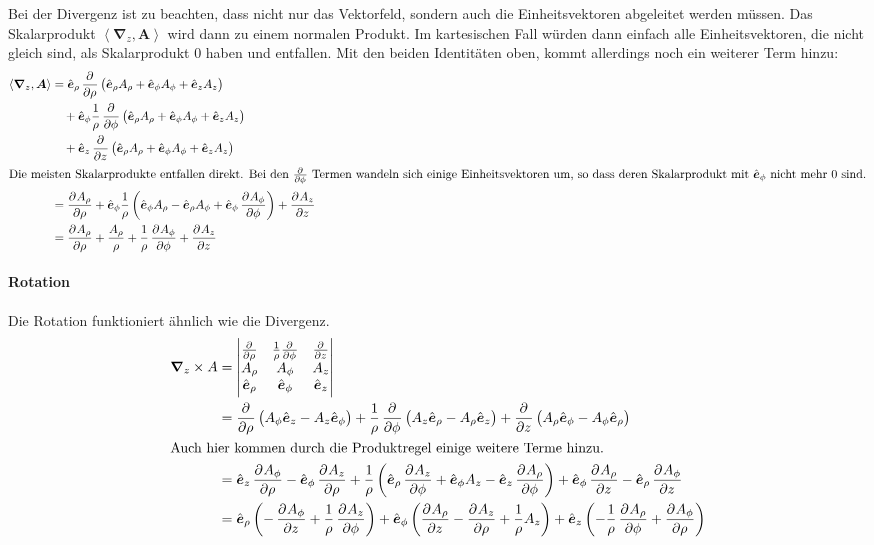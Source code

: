 \documentclass[11pt, ngerman, fleqn]{article}
\newcommand{\ev}{\hat{\vec e}}
\newcommand{\inner}[2]{\left\langle #1, #2 \right\rangle}
\newcommand{\vnabla}{\vec \nabla}
\renewcommand{\vec}[1]{\boldsymbol{#1}}
\begin{document}
Bei der Divergenz ist zu beachten, dass nicht nur das Vektorfeld, sondern auch
die Einheitsvektoren abgeleitet werden müssen. Das Skalarprodukt
$\inner{\vnabla_z}{\vec A}$ wird dann zu einem normalen Produkt. Im
kartesischen Fall würden dann einfach alle Einheitsvektoren, die nicht gleich
sind, als Skalarprodukt 0 haben und entfallen. Mit den beiden Identitäten oben, kommt allerdings noch ein weiterer Term hinzu:
\begin{align*}
	\inner{\vnabla_z}{\vec A}
	&=
	\ev_\rho \dpd{}\rho \del{\ev_\rho A_\rho + \ev_\phi A_\phi + \ev_z A_z} \\
	&\quad+\ev_\phi \frac 1\rho \dpd{}\phi \del{\ev_\rho A_\rho + \ev_\phi A_\phi + \ev_z A_z} \\
	&\quad+\ev_z \dpd{}z \del{\ev_\rho A_\rho + \ev_\phi A_\phi + \ev_z A_z} \\
	\intertext{Die meisten Skalarprodukte entfallen direkt. Bei den $\pd{}\phi$ Termen wandeln sich einige Einheitsvektoren um, so dass deren Skalarprodukt mit $\ev_\phi$ nicht mehr 0 sind.}
	&=
	\dpd{A_\rho}\rho + \ev_\phi \frac 1\rho \del{
		\ev_\phi A_\rho - \ev_\rho A_\phi + \ev_\phi \dpd{A_\phi}\phi
	} + \dpd{A_z}z \\
	&=
	\dpd{A_\rho}\rho + \frac{A_\rho}\rho  + \frac 1\rho \dpd{A_\phi}\phi
	 + \dpd{A_z}z
\end{align*}

\paragraph{Rotation}

Die Rotation funktioniert ähnlich wie die Divergenz.
\begin{align*}
	\vnabla_z \times A
	&=
	\begin{vmatrix}
		\pd{}\rho & \frac 1\rho \pd{}\phi & \pd{}z \\
		   A_\rho & A_\phi & A_z \\
		 \ev_\rho & \ev_\phi & \ev_z
	\end{vmatrix} \\
	&=
	\dpd{}\rho \del{A_\phi \ev_z - A_z \ev_\phi}
	+ \frac 1\rho \dpd{}\phi \del{A_z \ev_\rho - A_\rho \ev_z}
	+ \dpd{}z \del{A_\rho \ev_\phi - A_\phi \ev_\rho} \\
	\intertext{Auch hier kommen durch die Produktregel einige weitere Terme hinzu.}
	&=
	\ev_z \dpd{A_\phi}\rho - \ev_\phi \dpd{A_z}\rho
	+ \frac 1\rho \del{\ev_\rho \dpd{A_z}\phi + \ev_\phi A_z - \ev_z \dpd{A_\rho}\phi}
	+ \ev_\phi \dpd{A_\rho}z - \ev_\rho \dpd{A_\phi}z \\
	&=
	\ev_\rho \del{-\dpd{A_\phi}z
		+ \frac 1\rho  \dpd{A_z}\phi
	}
	+ \ev_\phi \del{ \dpd{A_\rho}z
		- \dpd{A_z}\rho
		+ \frac 1\rho A_z
	}
	+ \ev_z \del{- \frac 1\rho \dpd{A_\rho}\phi
		+ \dpd{A_\phi}\rho
	}
\end{align*}
\end{document}
